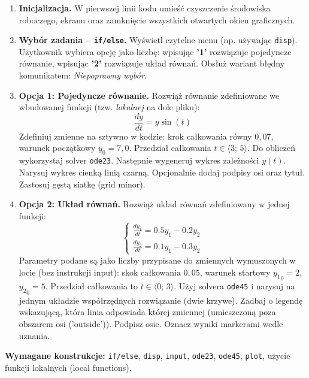 \documentclass[a4paper,11pt]{article}
\begin{document}
\begin{enumerate}[leftmargin=*, label=\textbf{\arabic*.}, itemsep=2pt]

  \item \textbf{Inicjalizacja.}
    W pierwszej linii kodu umieść czyszczenie środowiska roboczego, ekranu oraz zamknięcie wszystkich otwartych okien graficznych.

  \item \textbf{Wybór zadania -- \texttt{if/else}.}
    Wyświetl czytelne menu (np. używając \texttt{disp}). Użytkownik wybiera opcję jako liczbę: wpisując \textbf{'1'} rozwiązuje pojedyncze równanie, wpisując \textbf{'2'} rozwiązuje układ równań. Obsłuż wariant błędny komunikatem: \textit{Niepoprawny wybór}.

  \item \textbf{Opcja 1: Pojedyncze równanie.}
    Rozwiąż równanie zdefiniowane we wbudowanej funkcji (tzw. \textit{lokalnej} na dole pliku):
    \[ \frac{dy}{dt} = y\sin(t) \]
    Zdefiniuj zmienne na sztywno w kodzie: krok całkowania równy $0{,}07$, warunek początkowy $y_0 = 7{,}0$. Przedział całkowania $t \in \langle 3;\,5 \rangle$.
    Do obliczeń wykorzystaj solver \texttt{ode23}. Następnie wygeneruj wykres zależności $y(t)$. Narysuj wykres cienką linią czarną. Opcjonalnie dodaj podpisy osi oraz tytuł. Zastosuj gęstą siatkę (grid minor).

  \item \textbf{Opcja 2: Układ równań.}
    Rozwiąż układ równań zdefiniowany w jednej funkcji:\\[-0.5em]
    \[
    \begin{cases}
      \frac{dy_1}{dt} = 0.5y_1 - 0.2y_2 \\
      \frac{dy_2}{dt} = 0.1y_1 - 0.3y_2
    \end{cases}
    \]
    Parametry podane są jako liczby przypisane do zmiennych wymuszonych w locie (bez instrukcji input): skok całkowania $0{,}05$, warunek startowy $ {y_1}_{0} = 2 $, $ {y_2}_{0} = 5 $. Przedział całkowania to $t \in \langle 0;\,3 \rangle$.
    Użyj solvera \texttt{ode45} i narysuj na jednym układzie współrzędnych rozwiązanie (dwie krzywe). Zadbaj o legendę wskazującą, która linia odpowiada której zmiennej (umieszczoną poza obszarem osi ('outside')). Podpisz osie. Oznacz wyniki markerami wedle uznania.

\end{enumerate}

\vspace{0.3cm}
\begin{ramka}
\textbf{Wymagane konstrukcje:}
\texttt{if/else}, \texttt{disp}, \texttt{input}, \texttt{ode23}, \texttt{ode45}, \texttt{plot}, użycie funkcji lokalnych (local functions).
\end{ramka}
\end{document}
